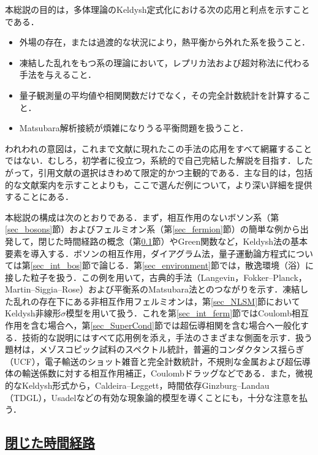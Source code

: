 \documentclass[a4paper,11pt]{ltjsarticle}
\newcommand{\subsectionlink}[1]{\subsection[#1]{\hyperlink{toc}{#1}}}
\begin{document}
本総説の目的は，多体理論のKeldysh定式化における次の応用と利点を示すことである．
\begin{itemize}
\item 外場の存在，または過渡的な状況により，熱平衡から外れた系を扱うこと．


\item 凍結した乱れをもつ系の理論において，レプリカ法および超対称法に代わる手法を与えること．


\item 量子観測量の平均値や相関関数だけでなく，その完全計数統計を計算すること．


\item Matsubara解析接続が煩雑になりうる平衡問題を扱うこと．
\end{itemize}
われわれの意図は，これまで文献に現れたこの手法の応用をすべて網羅することではない．むしろ，初学者に役立つ，系統的で自己完結した解説を目指す．したがって，引用文献の選択はきわめて限定的かつ主観的である．主な目的は，包括的な文献案内を示すことよりも，ここで選んだ例について，より深い詳細を提供することにある．


本総説の構成は次のとおりである．まず，相互作用のないボソン系（第\ref{sec_bosons}節）およびフェルミオン系（第\ref{sec_fermion}節）の簡単な例から出発して，閉じた時間経路の概念（第\ref{sec_contour}節）やGreen関数など，Keldysh法の基本要素を導入する．ボソンの相互作用，ダイアグラム法，量子運動論方程式については第\ref{sec_int_bos}節で論じる．第\ref{sec_environment}節では，散逸環境（浴）に接した粒子を扱う．この例を用いて，古典的手法（Langevin，Fokker--Planck，Martin--Siggia--Rose）および平衡系のMatsubara法とのつながりを示す．凍結した乱れの存在下にある非相互作用フェルミオンは，第\ref{sec_NLSM}節においてKeldysh非線形$\sigma$模型を用いて扱う．これを第\ref{sec_int_ferm}節ではCoulomb相互作用を含む場合へ，第\ref{sec_SuperCond}節では超伝導相関を含む場合へ一般化する．技術的な説明にはすべて応用例を添え，手法のさまざまな側面を示す．扱う題材は，メゾスコピック試料のスペクトル統計，普遍的コンダクタンス揺らぎ（UCF），電子輸送のショット雑音と完全計数統計，不規則な金属および超伝導体の輸送係数に対する相互作用補正，Coulombドラッグなどである．また，微視的なKeldysh形式から，Caldeira--Leggett，時間依存Ginzburg--Landau（TDGL），Usadelなどの有効な現象論的模型を導くことにも，十分な注意を払う．


\subsectionlink{閉じた時間経路}\label{sec_contour}
\end{document}
